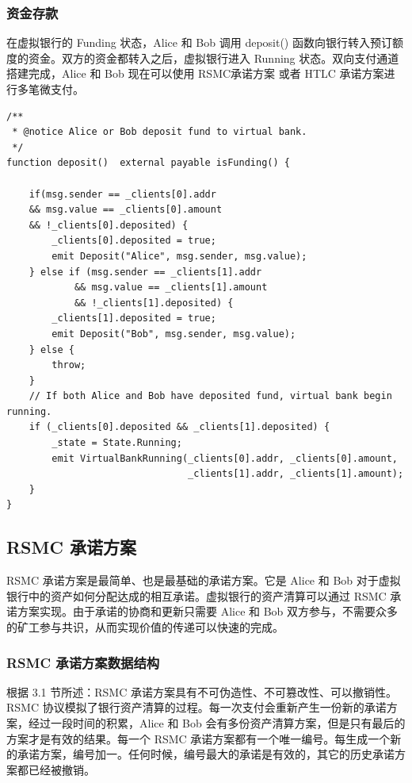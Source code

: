 \subsubsection{资金存款}
在虚拟银行的 Funding 状态，Alice 和 Bob 调用 deposit() 函数向银行转入预订额度的资金。双方的资金都转入之后，虚拟银行进入 Running 状态。双向支付通道搭建完成，Alice 和 Bob 现在可以使用 RSMC承诺方案 或者 HTLC 承诺方案进行多笔微支付。

\begin{lstlisting}[caption={存款}, label={lst:deposit}]
/**
 * @notice Alice or Bob deposit fund to virtual bank.
 */
function deposit()  external payable isFunding() {

    if(msg.sender == _clients[0].addr 
    && msg.value == _clients[0].amount 
    && !_clients[0].deposited) {
        _clients[0].deposited = true;
        emit Deposit("Alice", msg.sender, msg.value);
    } else if (msg.sender == _clients[1].addr 
            && msg.value == _clients[1].amount 
            && !_clients[1].deposited) {
        _clients[1].deposited = true;
        emit Deposit("Bob", msg.sender, msg.value);
    } else {
        throw;
    }
    // If both Alice and Bob have deposited fund, virtual bank begin running.
    if (_clients[0].deposited && _clients[1].deposited) {
        _state = State.Running;
        emit VirtualBankRunning(_clients[0].addr, _clients[0].amount, 
                                _clients[1].addr, _clients[1].amount);
    }
}

\end{lstlisting}

\subsection{RSMC 承诺方案}

RSMC 承诺方案是最简单、也是最基础的承诺方案。它是 Alice 和 Bob 对于虚拟银行中的资产如何分配达成的相互承诺。虚拟银行的资产清算可以通过 RSMC 承诺方案实现。由于承诺的协商和更新只需要 Alice 和 Bob 双方参与，不需要众多的矿工参与共识，从而实现价值的传递可以快速的完成。

\subsubsection{RSMC 承诺方案数据结构}
根据 3.1 节所述：RSMC 承诺方案具有不可伪造性、不可篡改性、可以撤销性。RSMC 协议模拟了银行资产清算的过程。每一次支付会重新产生一份新的承诺方案，经过一段时间的积累，Alice 和 Bob 会有多份资产清算方案，但是只有最后的方案才是有效的结果。每一个 RSMC 承诺方案都有一个唯一编号。每生成一个新的承诺方案，编号加一。任何时候，编号最大的承诺是有效的，其它的历史承诺方案都已经被撤销。

